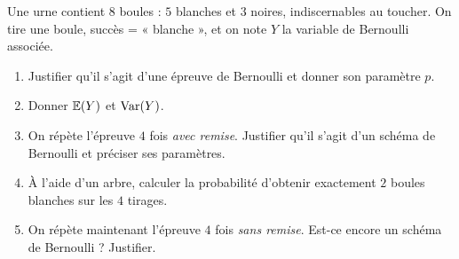 Une urne contient $8$ boules : $5$ blanches et $3$ noires, indiscernables au
toucher. On tire une boule, succès = « blanche », et on note $Y$ la variable
de Bernoulli associée.
\begin{enumerate}
	\item Justifier qu'il s'agit d'une épreuve de Bernoulli et donner son
	paramètre $p$.
	\item Donner $\mathbb{E}(Y)$ et $\mathrm{Var}(Y)$.
	\item On répète l'épreuve $4$ fois \emph{avec remise}. Justifier qu'il
	s'agit d'un schéma de Bernoulli et préciser ses paramètres.
	\item À l'aide d'un arbre, calculer la probabilité d'obtenir exactement
	$2$ boules blanches sur les $4$ tirages.
	\item On répète maintenant l'épreuve $4$ fois \emph{sans remise}.
	Est-ce encore un schéma de Bernoulli ? Justifier.
\end{enumerate}
